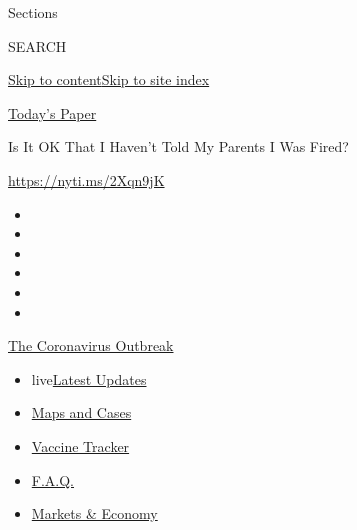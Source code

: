 Sections

SEARCH

\protect\hyperlink{site-content}{Skip to
content}\protect\hyperlink{site-index}{Skip to site index}

\href{https://myaccount.nytimes.com/auth/login?response_type=cookie\&client_id=vi}{}

\href{https://www.nytimes.com/section/todayspaper}{Today's Paper}

Is It OK That I Haven't Told My Parents I Was Fired?

\href{https://nyti.ms/2Xqn9jK}{https://nyti.ms/2Xqn9jK}

\begin{itemize}
\item
\item
\item
\item
\item
\item
\end{itemize}

\href{https://www.nytimes.com/news-event/coronavirus?action=click\&pgtype=Article\&state=default\&region=TOP_BANNER\&context=storylines_menu}{The
Coronavirus Outbreak}

\begin{itemize}
\tightlist
\item
  live\href{https://www.nytimes.com/2020/08/08/world/coronavirus-updates.html?action=click\&pgtype=Article\&state=default\&region=TOP_BANNER\&context=storylines_menu}{Latest
  Updates}
\item
  \href{https://www.nytimes.com/interactive/2020/us/coronavirus-us-cases.html?action=click\&pgtype=Article\&state=default\&region=TOP_BANNER\&context=storylines_menu}{Maps
  and Cases}
\item
  \href{https://www.nytimes.com/interactive/2020/science/coronavirus-vaccine-tracker.html?action=click\&pgtype=Article\&state=default\&region=TOP_BANNER\&context=storylines_menu}{Vaccine
  Tracker}
\item
  \href{https://www.nytimes.com/interactive/2020/world/coronavirus-tips-advice.html?action=click\&pgtype=Article\&state=default\&region=TOP_BANNER\&context=storylines_menu}{F.A.Q.}
\item
  \href{https://www.nytimes.com/live/2020/08/07/business/stock-market-today-coronavirus?action=click\&pgtype=Article\&state=default\&region=TOP_BANNER\&context=storylines_menu}{Markets
  \& Economy}
\end{itemize}

